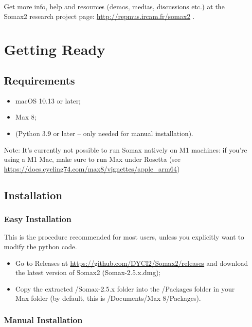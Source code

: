 Get more info, help and resources (demos, medias, discussions etc.) at the Somax2 research project page: \url{http://repmus.ircam.fr/somax2} .

\section{Getting Ready}

\subsection{Requirements}

\begin{itemize}
    \item macOS 10.13 or later;
    \item Max 8;
    \item (Python 3.9 or later -- only needed for manual installation).
\end{itemize}

Note: It's currently not possible to run Somax natively on M1 machines: if you're using a M1 Mac, make sure to run Max under Rosetta (see \url{https://docs.cycling74.com/max8/vignettes/apple_arm64}) 

\subsection{Installation}

\subsubsection{Easy Installation}

This is the procedure recommended for most users, unless you explicitly want to modify the python code.

\begin{itemize}
    \item Go to Releases at \url{https://github.com/DYCI2/Somax2/releases} and download the latest version of Somax2 (Somax-2.5.x.dmg);
    \item Copy the extracted /Somax-2.5.x folder  into the /Packages folder in your Max folder (by default, this is /Documents/Max 8/Packages).
\end{itemize}

\subsubsection{Manual Installation}

